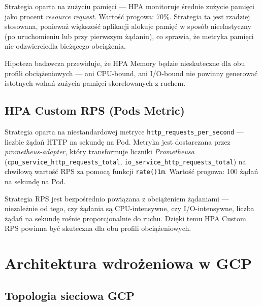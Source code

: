 Strategia oparta na zużyciu pamięci — HPA monitoruje średnie zużycie pamięci jako procent \textit{resource request}. Wartość progowa: 70\%. Strategia ta jest rzadziej stosowana, ponieważ większość aplikacji alokuje pamięć w sposób nieelastyczny (po uruchomieniu lub przy pierwszym żądaniu), co sprawia, że metryka pamięci nie odzwierciedla bieżącego obciążenia.



Hipoteza badawcza przewiduje, że HPA Memory będzie nieskuteczne dla obu profili obciążeniowych — ani CPU-bound, ani I/O-bound nie powinny generować istotnych wahań zużycia pamięci skorelowanych z ruchem.

\subsection{HPA Custom RPS (Pods Metric)}

Strategia oparta na niestandardowej metryce \texttt{http\_requests\_per\_second} — liczbie żądań HTTP na sekundę na Pod. Metryka jest dostarczana przez \textit{prometheus-adapter}, który transformuje liczniki \textit{Prometheusa} (\texttt{cpu\_service\_http\_requests\_total}, \texttt{io\_service\_http\_requests\_total}) na chwilową wartość RPS za pomocą funkcji \texttt{rate()\lbrack{}1m\rbrack{}}. Wartość progowa: 100 żądań na sekundę na Pod.



Strategia RPS jest bezpośrednio powiązana z obciążeniem żądaniami — niezależnie od tego, czy żądania są CPU-intensywne, czy I/O-intensywne, liczba żądań na sekundę rośnie proporcjonalnie do ruchu. Dzięki temu HPA Custom RPS powinna być skuteczna dla obu profili obciążeniowych.

\section{Architektura wdrożeniowa w GCP}

\subsection{Topologia sieciowa GCP}

